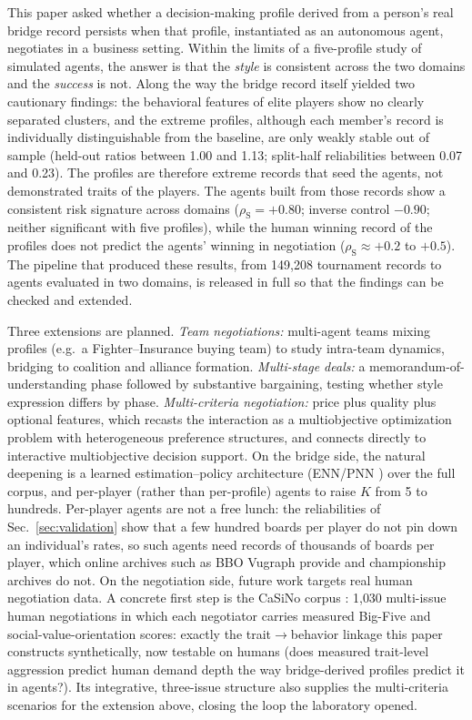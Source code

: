 \documentclass[runningheads]{llncs}
\newcommand{\rhoS}{\rho_{\mathrm{S}}}
\begin{document}
This paper asked whether a decision-making profile derived from a
person's real bridge record persists when that profile, instantiated
as an autonomous agent, negotiates in a business setting. Within the
limits of a five-profile study of simulated agents, the answer is that
the \emph{style} is consistent across the two domains and the
\emph{success} is not. Along the way the bridge record itself yielded
two cautionary findings: the behavioral features of elite players show
no clearly separated clusters, and the extreme profiles, although each
member's record is individually distinguishable from the baseline, are
only weakly stable out of sample (held-out ratios between 1.00 and
1.13; split-half reliabilities between 0.07 and 0.23). The profiles
are therefore extreme records that seed the agents, not demonstrated
traits of the players. The agents built from those records show a
consistent risk signature across domains ($\rhoS=+0.80$; inverse
control $-0.90$; neither significant with five profiles), while the
human winning record of the profiles does not predict the agents'
winning in negotiation ($\rhoS\approx+0.2$ to $+0.5$). The pipeline
that produced these results, from 149{,}208 tournament records to
agents evaluated in two domains, is released in full so that the
findings can be checked and extended.

Three extensions are planned. \emph{Team negotiations:} multi-agent
teams mixing profiles (e.g.\ a Fighter--Insurance buying team) to study
intra-team dynamics, bridging to coalition and alliance formation.
\emph{Multi-stage deals:} a memorandum-of-understanding phase followed
by substantive bargaining, testing whether style expression differs by
phase. \emph{Multi-criteria negotiation:} price plus quality plus
optional features, which recasts the interaction as a multiobjective
optimization problem with heterogeneous preference structures, and connects directly to interactive multiobjective decision support.
On the bridge side, the natural deepening is a learned
estimation--policy architecture (ENN/PNN \cite{rong2019bridge}) over the
full corpus, and per-player (rather than per-profile) agents to raise
$K$ from 5 to hundreds. Per-player agents are not a free lunch: the
reliabilities of Sec.~\ref{sec:validation} show that a few hundred
boards per player do not pin down an individual's rates, so such
agents need records of thousands of boards per player, which online
archives such as BBO Vugraph provide and championship archives do not.
On the negotiation side, future work targets
real human negotiation data. A concrete first step is the CaSiNo corpus
\cite{chawla2021casino}: 1{,}030 multi-issue human negotiations in
which each negotiator carries measured Big-Five and social-value-orientation scores: exactly the trait$\to$behavior linkage this paper constructs
synthetically, now testable on humans (does measured trait-level
aggression predict human demand depth the way bridge-derived profiles
predict it in agents?). Its integrative, three-issue structure also
supplies the multi-criteria scenarios for the extension above, closing
the loop the laboratory opened.
\end{document}

